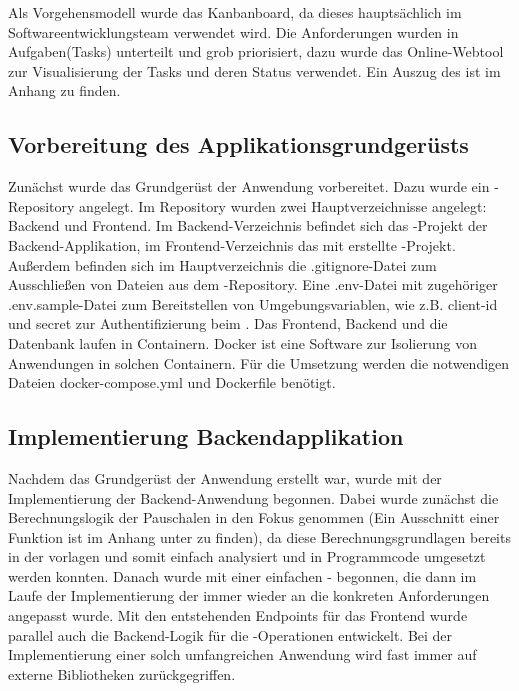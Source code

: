 Als Vorgehensmodell wurde das Kanbanboard, da dieses hauptsächlich im Softwareentwicklungsteam verwendet wird. Die Anforderungen wurden in Aufgaben(Tasks) unterteilt und grob priorisiert, dazu wurde das Online-Webtool  zur Visualisierung der Tasks und deren Status verwendet.
Ein Auszug des  ist im Anhang zu finden.

\subsection{Vorbereitung des Applikationsgrundgerüsts}

Zunächst wurde das Grundgerüst der Anwendung vorbereitet. Dazu wurde ein -Repository angelegt. Im Repository wurden zwei Hauptverzeichnisse angelegt: Backend und Frontend. Im Backend-Verzeichnis befindet sich das -Projekt der Backend-Applikation, im Frontend-Verzeichnis das mit  erstellte  -Projekt. Außerdem befinden sich im Hauptverzeichnis die .gitignore-Datei zum Ausschließen von Dateien aus dem -Repository. Eine .env-Datei mit zugehöriger .env.sample-Datei zum Bereitstellen von Umgebungsvariablen, wie z.B. client-id und secret zur Authentifizierung beim . Das Frontend, Backend und die Datenbank laufen in Containern. Docker ist eine Software zur Isolierung von Anwendungen in solchen Containern. Für die Umsetzung werden die notwendigen Dateien docker-compose.yml und Dockerfile benötigt.

\subsection{Implementierung Backendapplikation}

Nachdem das Grundgerüst der Anwendung erstellt war, wurde mit der Implementierung der Backend-Anwendung begonnen. Dabei wurde zunächst die Berechnungslogik der Pauschalen in den Fokus genommen (Ein Ausschnitt einer Funktion ist im Anhang unter  zu finden), da diese Berechnungsgrundlagen bereits in der  vorlagen und somit einfach analysiert und in Programmcode umgesetzt werden konnten. Danach wurde mit einer einfachen - begonnen, die dann im Laufe der Implementierung der  immer wieder an die konkreten Anforderungen angepasst wurde. Mit den entstehenden Endpoints für das Frontend wurde parallel auch die Backend-Logik für die -Operationen entwickelt. Bei der Implementierung einer solch umfangreichen Anwendung wird fast immer auf externe Bibliotheken zurückgegriffen.

